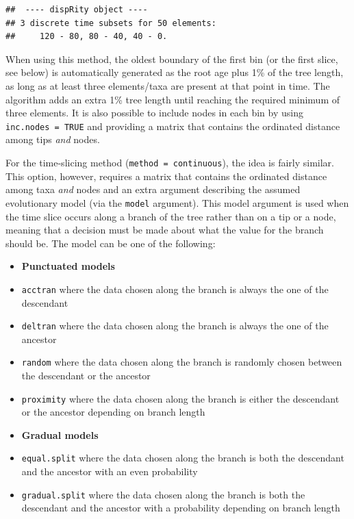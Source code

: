 \documentclass[]{book}
\theoremstyle{definition}
\theoremstyle{definition}
\theoremstyle{remark}
\begin{document}
\begin{verbatim}
##  ---- dispRity object ---- 
## 3 discrete time subsets for 50 elements:
##     120 - 80, 80 - 40, 40 - 0.
\end{verbatim}

When using this method, the oldest boundary of the first bin (or the
first slice, see below) is automatically generated as the root age plus
1\% of the tree length, as long as at least three elements/taxa are
present at that point in time. The algorithm adds an extra 1\% tree
length until reaching the required minimum of three elements. It is also
possible to include nodes in each bin by using
\texttt{inc.nodes\ =\ TRUE} and providing a matrix that contains the
ordinated distance among tips \emph{and} nodes.

For the time-slicing method (\texttt{method\ =\ continuous}), the idea
is fairly similar. This option, however, requires a matrix that contains
the ordinated distance among taxa \emph{and} nodes and an extra argument
describing the assumed evolutionary model (via the \texttt{model}
argument). This model argument is used when the time slice occurs along
a branch of the tree rather than on a tip or a node, meaning that a
decision must be made about what the value for the branch should be. The
model can be one of the following:

\begin{itemize}
\item
  \textbf{Punctuated models}
\item
  \texttt{acctran} where the data chosen along the branch is always the
  one of the descendant
\item
  \texttt{deltran} where the data chosen along the branch is always the
  one of the ancestor
\item
  \texttt{random} where the data chosen along the branch is randomly
  chosen between the descendant or the ancestor
\item
  \texttt{proximity} where the data chosen along the branch is either
  the descendant or the ancestor depending on branch length
\item
  \textbf{Gradual models}
\item
  \texttt{equal.split} where the data chosen along the branch is both
  the descendant and the ancestor with an even probability
\item
  \texttt{gradual.split} where the data chosen along the branch is both
  the descendant and the ancestor with a probability depending on branch
  length
\end{itemize}
\end{document}

